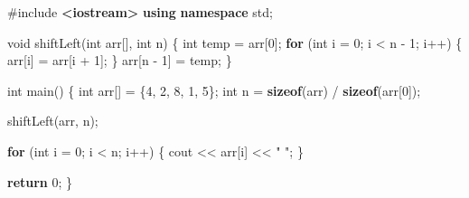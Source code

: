 \documentclass[
]{article}
\newenvironment{Shaded}{}{}
\newcommand{\ControlFlowTok}[1]{\textcolor[rgb]{0.00,0.44,0.13}{\textbf{#1}}}
\newcommand{\DataTypeTok}[1]{\textcolor[rgb]{0.56,0.13,0.00}{#1}}
\newcommand{\DecValTok}[1]{\textcolor[rgb]{0.25,0.63,0.44}{#1}}
\newcommand{\ImportTok}[1]{\textcolor[rgb]{0.00,0.50,0.00}{\textbf{#1}}}
\newcommand{\KeywordTok}[1]{\textcolor[rgb]{0.00,0.44,0.13}{\textbf{#1}}}
\newcommand{\NormalTok}[1]{#1}
\newcommand{\OperatorTok}[1]{\textcolor[rgb]{0.40,0.40,0.40}{#1}}
\newcommand{\PreprocessorTok}[1]{\textcolor[rgb]{0.74,0.48,0.00}{#1}}
\newcommand{\StringTok}[1]{\textcolor[rgb]{0.25,0.44,0.63}{#1}}
\begin{document}
\begin{Shaded}
\begin{Highlighting}[]
\PreprocessorTok{\#include }\ImportTok{\textless{}iostream\textgreater{}}
\KeywordTok{using} \KeywordTok{namespace}\NormalTok{ std}\OperatorTok{;}

\DataTypeTok{void}\NormalTok{ shiftLeft}\OperatorTok{(}\DataTypeTok{int}\NormalTok{ arr}\OperatorTok{[],} \DataTypeTok{int}\NormalTok{ n}\OperatorTok{)} \OperatorTok{\{}
    \DataTypeTok{int}\NormalTok{ temp }\OperatorTok{=}\NormalTok{ arr}\OperatorTok{[}\DecValTok{0}\OperatorTok{];}
    \ControlFlowTok{for} \OperatorTok{(}\DataTypeTok{int}\NormalTok{ i }\OperatorTok{=} \DecValTok{0}\OperatorTok{;}\NormalTok{ i }\OperatorTok{\textless{}}\NormalTok{ n }\OperatorTok{{-}} \DecValTok{1}\OperatorTok{;}\NormalTok{ i}\OperatorTok{++)} \OperatorTok{\{}
\NormalTok{        arr}\OperatorTok{[}\NormalTok{i}\OperatorTok{]} \OperatorTok{=}\NormalTok{ arr}\OperatorTok{[}\NormalTok{i }\OperatorTok{+} \DecValTok{1}\OperatorTok{];}
    \OperatorTok{\}}
\NormalTok{    arr}\OperatorTok{[}\NormalTok{n }\OperatorTok{{-}} \DecValTok{1}\OperatorTok{]} \OperatorTok{=}\NormalTok{ temp}\OperatorTok{;}
\OperatorTok{\}}

\DataTypeTok{int}\NormalTok{ main}\OperatorTok{()} \OperatorTok{\{}
    \DataTypeTok{int}\NormalTok{ arr}\OperatorTok{[]} \OperatorTok{=} \OperatorTok{\{}\DecValTok{4}\OperatorTok{,} \DecValTok{2}\OperatorTok{,} \DecValTok{8}\OperatorTok{,} \DecValTok{1}\OperatorTok{,} \DecValTok{5}\OperatorTok{\};}
    \DataTypeTok{int}\NormalTok{ n }\OperatorTok{=} \KeywordTok{sizeof}\OperatorTok{(}\NormalTok{arr}\OperatorTok{)} \OperatorTok{/} \KeywordTok{sizeof}\OperatorTok{(}\NormalTok{arr}\OperatorTok{[}\DecValTok{0}\OperatorTok{]);}

\NormalTok{    shiftLeft}\OperatorTok{(}\NormalTok{arr}\OperatorTok{,}\NormalTok{ n}\OperatorTok{);}

    \ControlFlowTok{for} \OperatorTok{(}\DataTypeTok{int}\NormalTok{ i }\OperatorTok{=} \DecValTok{0}\OperatorTok{;}\NormalTok{ i }\OperatorTok{\textless{}}\NormalTok{ n}\OperatorTok{;}\NormalTok{ i}\OperatorTok{++)} \OperatorTok{\{}
\NormalTok{        cout }\OperatorTok{\textless{}\textless{}}\NormalTok{ arr}\OperatorTok{[}\NormalTok{i}\OperatorTok{]} \OperatorTok{\textless{}\textless{}} \StringTok{" "}\OperatorTok{;}
    \OperatorTok{\}}

    \ControlFlowTok{return} \DecValTok{0}\OperatorTok{;}
\OperatorTok{\}}
\end{Highlighting}
\end{Shaded}
\end{document}
